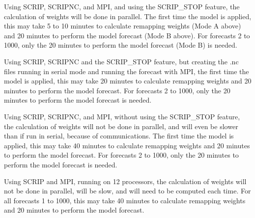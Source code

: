\begin{list}{)\hfill}
            { \leftmargin 15mm 
             \rightmargin 5mm \itemsep 0mm \parsep 0mm}

\item  Using {\F SCRIP}, {\F SCRIPNC}, and {\F MPI}, and using the {\file 
SCRIP\_STOP} feature, the calculation of weights will be done in parallel. 
The first time the model is applied, this may take 5 to 10 minutes to 
calculate remapping weights (Mode A above) and 20 minutes to perform the 
model forecast (Mode B above). For forecasts 2 to 1000, only the 20 minutes 
to perform the model forecast (Mode B) is needed. 

\item Using {\F SCRIP}, {\F SCRIPNC} and the {\file SCRIP\_STOP} feature, 
but creating the {\file .nc} files running in serial mode and running the 
forecast with {\F MPI}, the first time the model is applied, this may take 
20 minutes to calculate remapping weights and 20 minutes to perform the 
model forecast. For forecasts 2 to 1000, only the 20 minutes to perform 
the model forecast is needed. 

\item  Using {\F SCRIP}, {\F SCRIPNC}, and {\F MPI}, without using the 
{\file SCRIP\_STOP} feature, the calculation of weights will not be done 
in parallel, and will even be slower than if run in serial, because of 
communications. The first time the model is applied, this may take 40 
minutes to calculate remapping weights and 20 minutes to perform the model 
forecast.  For forecasts 2 to 1000, only the 20 minutes to perform the 
model forecast is needed. 

\item Using {\F SCRIP} and {\F MPI}, running on 12 processors, the 
calculation of weights will not be done in parallel, will be slow, 
and will need to be computed each time. For all forecasts 1 to 1000, 
this may take 40 minutes to calculate remapping weights and 20 minutes 
to perform the model forecast.  

\end{list}

